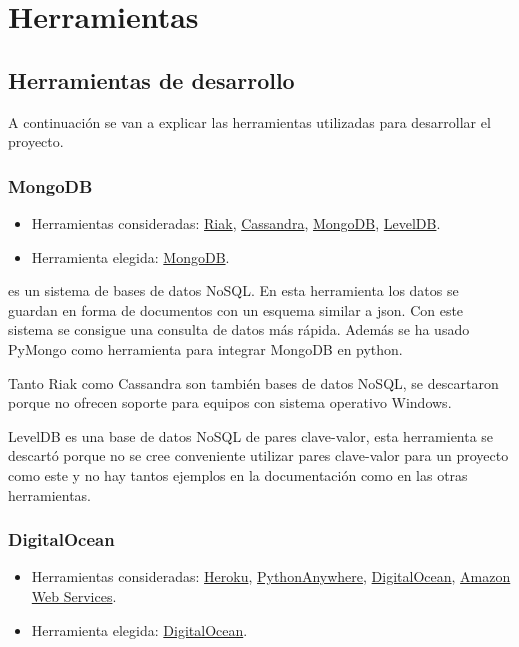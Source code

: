 \section{Herramientas}

\subsection{Herramientas de desarrollo}

A continuación se van a explicar las herramientas utilizadas para desarrollar el proyecto.

\subsubsection{MongoDB}

\begin{itemize}
	\tightlist
	\item
	Herramientas consideradas:
	\href{http://basho.com/riak/}{Riak}, 
	\href{http://cassandra.apache.org/}{Cassandra},
	\href{https://www.mongodb.com/}{MongoDB}, 
	\href{http://leveldb.org/}{LevelDB}.
	\item
	Herramienta elegida:
	\href{https://www.mongodb.com/}{MongoDB}.
\end{itemize}

 \cite{misc:mongodb} es un sistema de bases de datos NoSQL. En esta herramienta los datos se guardan en forma de documentos con un esquema similar a json. Con este sistema se consigue una consulta de datos más rápida. Además se ha usado PyMongo \cite{docs:pymongo} como herramienta para integrar MongoDB en python.

Tanto Riak como Cassandra son también bases de datos NoSQL, se descartaron porque no ofrecen soporte para equipos con sistema operativo Windows. 

LevelDB es una base de datos NoSQL de pares clave-valor, esta herramienta se descartó porque no se cree conveniente utilizar pares clave-valor para un proyecto como este y no hay tantos ejemplos en la documentación como en las otras herramientas.

\subsubsection{DigitalOcean}

\begin{itemize}
	\tightlist
	\item
	Herramientas consideradas:
	\href{https://www.heroku.com/}{Heroku}, 
	\href{https://www.pythonanywhere.com/}{PythonAnywhere},
	\href{https://www.digitalocean.com/}{DigitalOcean}, 
	\href{https://aws.amazon.com/es/}{Amazon Web Services}.
	\item
	Herramienta elegida:
	\href{https://www.digitalocean.com/}{DigitalOcean}.
\end{itemize}

